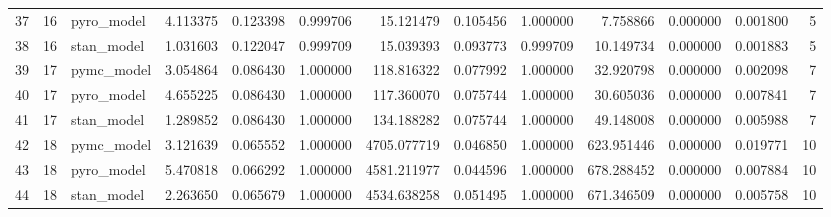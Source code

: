 \begin{tabular}{lrlrrrrrrrrrr}
37 & 16 & pyro_model & 4.113375 & 0.123398 & 0.999706 & 15.121479 & 0.105456 & 1.000000 & 7.758866 & 0.000000 & 0.001800 & 5 \\
38 & 16 & stan_model & 1.031603 & 0.122047 & 0.999709 & 15.039393 & 0.093773 & 0.999709 & 10.149734 & 0.000000 & 0.001883 & 5 \\
39 & 17 & pymc_model & 3.054864 & 0.086430 & 1.000000 & 118.816322 & 0.077992 & 1.000000 & 32.920798 & 0.000000 & 0.002098 & 7 \\
40 & 17 & pyro_model & 4.655225 & 0.086430 & 1.000000 & 117.360070 & 0.075744 & 1.000000 & 30.605036 & 0.000000 & 0.007841 & 7 \\
41 & 17 & stan_model & 1.289852 & 0.086430 & 1.000000 & 134.188282 & 0.075744 & 1.000000 & 49.148008 & 0.000000 & 0.005988 & 7 \\
42 & 18 & pymc_model & 3.121639 & 0.065552 & 1.000000 & 4705.077719 & 0.046850 & 1.000000 & 623.951446 & 0.000000 & 0.019771 & 10 \\
43 & 18 & pyro_model & 5.470818 & 0.066292 & 1.000000 & 4581.211977 & 0.044596 & 1.000000 & 678.288452 & 0.000000 & 0.007884 & 10 \\
44 & 18 & stan_model & 2.263650 & 0.065679 & 1.000000 & 4534.638258 & 0.051495 & 1.000000 & 671.346509 & 0.000000 & 0.005758 & 10 \\
\bottomrule
\end{tabular}
